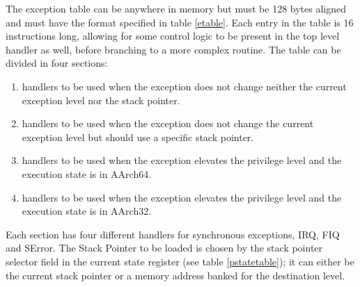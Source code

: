 \documentclass[12pt,a4paper,openright,twoside]{report}
\begin{document}
The exception table can be anywhere in memory but must be 128 bytes aligned and 
must have the format specified in table \ref{etable}.
Each entry in the table is 16 instructions long, allowing for some control logic 
to be present in the top level handler as well, before branching to a more complex
routine.
The table can be divided in four sections:
\begin{enumerate}
    \item handlers to be used when the exception does not change neither the current 
        exception level nor the stack pointer.
    \item handlers to be used when the exception does not change the current 
        exception level but should use a specific stack pointer.
    \item handlers to be used when the exception elevates the privilege level and
        the execution state is in AArch64.
    \item handlers to be used when the exception elevates the privilege level and
        the execution state is in AArch32.
\end{enumerate}

Each section has four different handlers for synchronous exceptions, IRQ, FIQ
and SError. The Stack Pointer to be loaded is chosen by the stack pointer selector
field in the current state register (see table \ref{pstatetable}); it can either be the current stack pointer or 
a memory address banked for the destination level.
\end{document}
